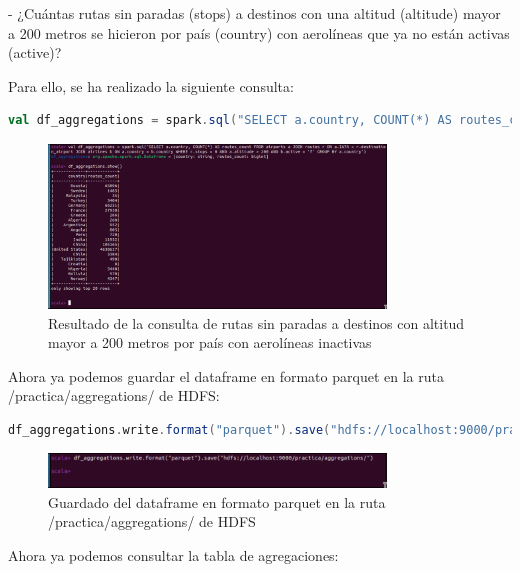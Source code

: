 - ¿Cuántas rutas sin paradas (stops) a destinos con una altitud (altitude) mayor a 200 metros
se hicieron por país (country) con aerolíneas que ya no están activas (active)?

Para ello, se ha realizado la siguiente consulta:

\begin{lstlisting}[language=scala]
val df_aggregations = spark.sql("SELECT a.country, COUNT(*) AS routes_count FROM airports a JOIN routes r ON a.IATA = r.destination_airport JOIN airlines b ON a.country = b.country WHERE r.stops = 0 AND a.altitude > 200 AND b.active = 'f' GROUP BY a.country")
\end{lstlisting}

\begin{figure}[H]
    \centering
    \includegraphics[width=0.8\textwidth]{figures/66.png}
    \caption{Resultado de la consulta de rutas sin paradas a destinos con altitud mayor a 200 metros por país con aerolíneas inactivas}
    \label{fig:consulta7}
\end{figure}

Ahora ya podemos guardar el dataframe en formato parquet en la ruta /practica/aggregations/ de HDFS:

\begin{lstlisting}[language=scala]
df_aggregations.write.format("parquet").save("hdfs://localhost:9000/practica/aggregations/") 
\end{lstlisting}

\begin{figure}[H]
    \centering
    \includegraphics[width=0.8\textwidth]{figures/67.png}
    \caption{Guardado del dataframe en formato parquet en la ruta /practica/aggregations/ de HDFS}
    \label{fig:guardado}
\end{figure}

Ahora ya podemos consultar la tabla de agregaciones:

